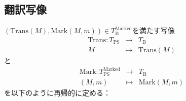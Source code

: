 \documentclass[dvipdfmx,uplatex]{jsarticle}
\theoremstyle{customnonumberbreakfortheorem}
\theoremstyle{customnonumberbreakforproof}
\begin{document}
\subsection{翻訳写像}

\((\textrm{Trans}(M),\textrm{Mark}(M,m)) \in T_{\textrm{B}}^{\textrm{Marked}}\)を満たす写像
\begin{eqnarray*}
\textrm{Trans} \colon T_{\textrm{PS}} & \to & T_{\textrm{B}} \\
M & \mapsto & \textrm{Trans}(M)
\end{eqnarray*}
と
\begin{eqnarray*}
\textrm{Mark} \colon T_{\textrm{PS}}^{\textrm{Marked}} & \to & T_{\textrm{B}} \\
(M,m) & \mapsto & \textrm{Mark}(M,m)
\end{eqnarray*}
を以下のように再帰的に定める：
\end{document}
